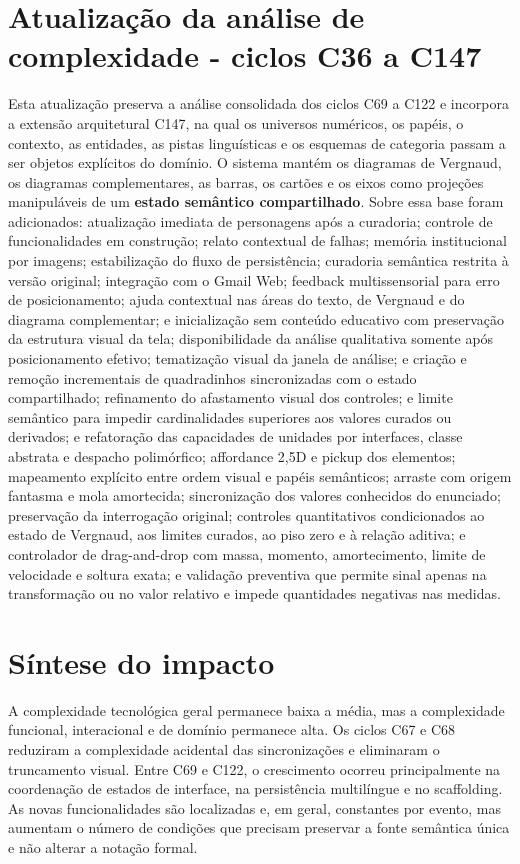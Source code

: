 \documentclass[12pt,a4paper]{article}
\begin{document}
\section*{Atualização da análise de complexidade - ciclos C36 a C147}

Esta atualização preserva a análise consolidada dos ciclos C69 a C122 e incorpora a extensão arquitetural C147, na qual os universos numéricos, os papéis, o contexto, as entidades, as pistas linguísticas e os esquemas de categoria passam a ser objetos explícitos do domínio. O sistema mantém os diagramas de Vergnaud, os diagramas complementares, as barras, os cartões e os eixos como projeções manipuláveis de um \textbf{estado semântico compartilhado}. Sobre essa base foram adicionados: atualização imediata de personagens após a curadoria; controle de funcionalidades em construção; relato contextual de falhas; memória institucional por imagens; estabilização do fluxo de persistência; curadoria semântica restrita à versão original; integração com o Gmail Web; feedback multissensorial para erro de posicionamento; ajuda contextual nas áreas do texto, de Vergnaud e do diagrama complementar; e inicialização sem conteúdo educativo com preservação da estrutura visual da tela; disponibilidade da análise qualitativa somente após posicionamento efetivo; tematização visual da janela de análise; e criação e remoção incrementais de quadradinhos sincronizadas com o estado compartilhado; refinamento do afastamento visual dos controles; e limite semântico para impedir cardinalidades superiores aos valores curados ou derivados; e refatoração das capacidades de unidades por interfaces, classe abstrata e despacho polimórfico; affordance 2,5D e pickup dos elementos; mapeamento explícito entre ordem visual e papéis semânticos; arraste com origem fantasma e mola amortecida; sincronização dos valores conhecidos do enunciado; preservação da interrogação original; controles quantitativos condicionados ao estado de Vergnaud, aos limites curados, ao piso zero e à relação aditiva; e controlador de drag-and-drop com massa, momento, amortecimento, limite de velocidade e soltura exata; e validação preventiva que permite sinal apenas na transformação ou no valor relativo e impede quantidades negativas nas medidas.

\section{Síntese do impacto}

A complexidade tecnológica geral permanece baixa a média, mas a complexidade funcional, interacional e de domínio permanece alta. Os ciclos C67 e C68 reduziram a complexidade acidental das sincronizações e eliminaram o truncamento visual. Entre C69 e C122, o crescimento ocorreu principalmente na coordenação de estados de interface, na persistência multilíngue e no scaffolding. As novas funcionalidades são localizadas e, em geral, constantes por evento, mas aumentam o número de condições que precisam preservar a fonte semântica única e não alterar a notação formal.
\end{document}
